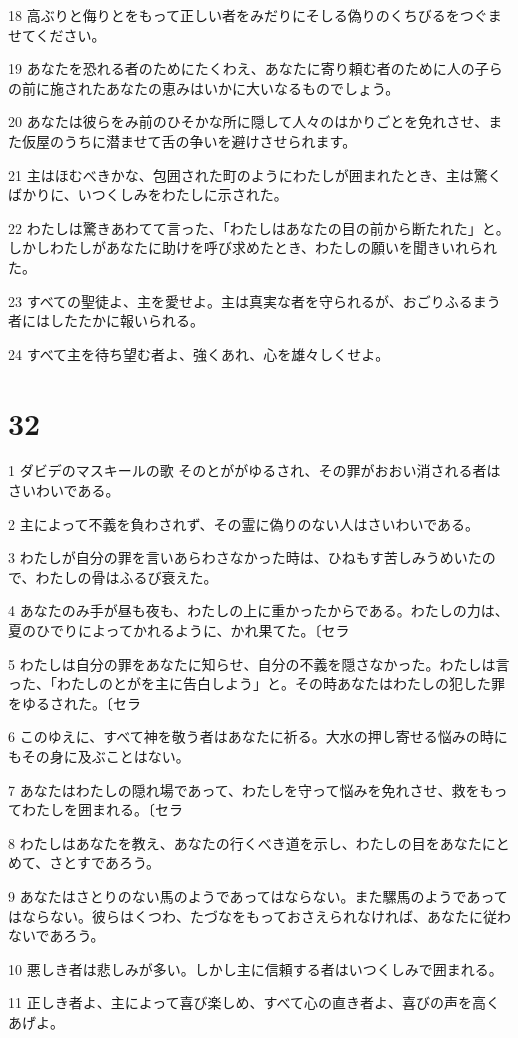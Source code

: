 \par 18 高ぶりと侮りとをもって正しい者をみだりにそしる偽りのくちびるをつぐませてください。
\par 19 あなたを恐れる者のためにたくわえ、あなたに寄り頼む者のために人の子らの前に施されたあなたの恵みはいかに大いなるものでしょう。
\par 20 あなたは彼らをみ前のひそかな所に隠して人々のはかりごとを免れさせ、また仮屋のうちに潜ませて舌の争いを避けさせられます。
\par 21 主はほむべきかな、包囲された町のようにわたしが囲まれたとき、主は驚くばかりに、いつくしみをわたしに示された。
\par 22 わたしは驚きあわてて言った、「わたしはあなたの目の前から断たれた」と。しかしわたしがあなたに助けを呼び求めたとき、わたしの願いを聞きいれられた。
\par 23 すべての聖徒よ、主を愛せよ。主は真実な者を守られるが、おごりふるまう者にはしたたかに報いられる。
\par 24 すべて主を待ち望む者よ、強くあれ、心を雄々しくせよ。

\chapter{32}

\par 1 ダビデのマスキールの歌 そのとががゆるされ、その罪がおおい消される者はさいわいである。
\par 2 主によって不義を負わされず、その霊に偽りのない人はさいわいである。
\par 3 わたしが自分の罪を言いあらわさなかった時は、ひねもす苦しみうめいたので、わたしの骨はふるび衰えた。
\par 4 あなたのみ手が昼も夜も、わたしの上に重かったからである。わたしの力は、夏のひでりによってかれるように、かれ果てた。〔セラ
\par 5 わたしは自分の罪をあなたに知らせ、自分の不義を隠さなかった。わたしは言った、「わたしのとがを主に告白しよう」と。その時あなたはわたしの犯した罪をゆるされた。〔セラ
\par 6 このゆえに、すべて神を敬う者はあなたに祈る。大水の押し寄せる悩みの時にもその身に及ぶことはない。
\par 7 あなたはわたしの隠れ場であって、わたしを守って悩みを免れさせ、救をもってわたしを囲まれる。〔セラ
\par 8 わたしはあなたを教え、あなたの行くべき道を示し、わたしの目をあなたにとめて、さとすであろう。
\par 9 あなたはさとりのない馬のようであってはならない。また騾馬のようであってはならない。彼らはくつわ、たづなをもっておさえられなければ、あなたに従わないであろう。
\par 10 悪しき者は悲しみが多い。しかし主に信頼する者はいつくしみで囲まれる。
\par 11 正しき者よ、主によって喜び楽しめ、すべて心の直き者よ、喜びの声を高くあげよ。

